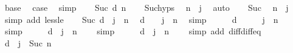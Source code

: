 \begin{isabellebody}
\ base\ \isamarkupfalse%
\ {\isacharquery}{\kern0pt}case\ \isamarkupfalse%
\ simp\isanewline
{}\isamarkupfalse%
\isanewline
\ \ \isamarkupfalse%
\ {\isacharparenleft}{\kern0pt}Suc\ d\ n{\isacharparenright}{\kern0pt}\isanewline
\ \ \isamarkupfalse%
\ Suc{\isachardot}{\kern0pt}hyps\ \isamarkupfalse%
\ {\isachardoublequoteopen}n\ {\isasymnoteq}\ j{\isachardoublequoteclose}\ \isamarkupfalse%
\ auto\isanewline
\ \ \isamarkupfalse%
\ Suc\ \isamarkupfalse%
\ {\isachardoublequoteopen}n\ {\isacharless}{\kern0pt}\ j{\isachardoublequoteclose}\ \isamarkupfalse%
\ {\isacharparenleft}{\kern0pt}simp\ add{\isacharcolon}{\kern0pt}\ less{\isacharunderscore}{\kern0pt}le{\isacharparenright}{\kern0pt}\isanewline
\ \ \isamarkupfalse%
\ {\isacartoucheopen}Suc\ d\ {\isacharequal}{\kern0pt}\ j\ {\isacharminus}{\kern0pt}\ n{\isacartoucheclose}\ \isamarkupfalse%
\ {\isachardoublequoteopen}d\ {\isacharplus}{\kern0pt}\ {}\ {\isacharequal}{\kern0pt}\ j\ {\isacharminus}{\kern0pt}\ n{\isachardoublequoteclose}\ \isamarkupfalse%
\ simp\isanewline
\ \ \isamarkupfalse%
\ \isamarkupfalse%
\ {\isachardoublequoteopen}d\ {\isacharplus}{\kern0pt}\ {}\ {\isacharminus}{\kern0pt}\ {}\ {\isacharequal}{\kern0pt}\ j\ {\isacharminus}{\kern0pt}\ n\ {\isacharminus}{\kern0pt}\ {}{\isachardoublequoteclose}\ \isamarkupfalse%
\ simp\isanewline
\ \ \isamarkupfalse%
\ \isamarkupfalse%
\ {\isachardoublequoteopen}d\ {\isacharequal}{\kern0pt}\ j\ {\isacharminus}{\kern0pt}\ n\ {\isacharminus}{\kern0pt}\ {}{\isachardoublequoteclose}\ \isamarkupfalse%
\ simp\isanewline
\ \ \isamarkupfalse%
\ \isamarkupfalse%
\ {\isachardoublequoteopen}d\ {\isacharequal}{\kern0pt}\ j\ {\isacharminus}{\kern0pt}\ {\isacharparenleft}{\kern0pt}n\ {\isacharplus}{\kern0pt}\ {}{\isacharparenright}{\kern0pt}{\isachardoublequoteclose}\ \isamarkupfalse%
\ {\isacharparenleft}{\kern0pt}simp\ add{\isacharcolon}{\kern0pt}\ diff{\isacharunderscore}{\kern0pt}diff{\isacharunderscore}{\kern0pt}eq{\isacharparenright}{\kern0pt}\isanewline
\ \ \isamarkupfalse%
\ \isamarkupfalse%
\ {\isachardoublequoteopen}d\ {\isacharequal}{\kern0pt}\ j\ {\isacharminus}{\kern0pt}\ Suc\ n{\isachardoublequoteclose}\ \isamarkupfalse%

\end{isabellebody}
